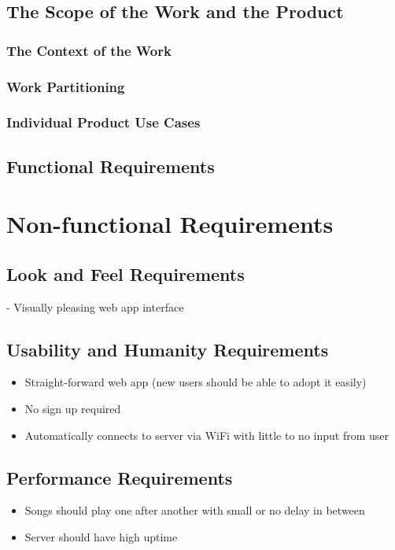 \documentclass[12pt, titlepage]{article}
\begin{document}
\subsection{The Scope of the Work and the Product}

\subsubsection{The Context of the Work}

\subsubsection{Work Partitioning}

\subsubsection{Individual Product Use Cases}

\subsection{Functional Requirements}

\section{Non-functional Requirements}

\subsection{Look and Feel Requirements}

- Visually pleasing web app interface

\subsection{Usability and Humanity Requirements}
\begin{itemize}
\item Straight-forward web app (new users should be able to adopt it easily)
\item No sign up required
\item Automatically connects to server via WiFi with little to no input from user
\end{itemize}
\subsection{Performance Requirements}
\begin{itemize}
\item Songs should play one after another with small or no delay in between
\item Server should have high uptime
\end{itemize}
\end{document}
